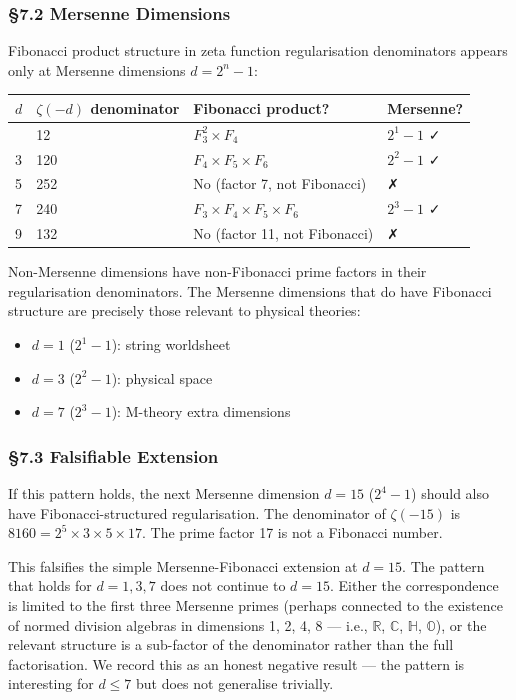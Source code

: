 \documentclass[
  11pt,
  a4paper]{article}
\providecommand{\tightlist}{%
  \setlength{\itemsep}{0pt}\setlength{\parskip}{0pt}}
\begin{document}
\subsubsection{§7.2 Mersenne Dimensions}\label{mersenne-dimensions}

Fibonacci product structure in zeta function regularisation denominators
appears only at Mersenne dimensions \(d = 2^n - 1\):

\begin{longtable}[]{@{}llll@{}}
\toprule\noalign{}
\(d\) & \(\zeta(-d)\) denominator & Fibonacci product? & Mersenne? \\
\midrule\noalign{}
\endhead
\bottomrule\noalign{}
\endlastfoot
1 & 12 & \(F_3^2 \times F_4\) & \(2^1 - 1\) ✓ \\
3 & 120 & \(F_4 \times F_5 \times F_6\) & \(2^2 - 1\) ✓ \\
5 & 252 & No (factor 7, not Fibonacci) & ✗ \\
7 & 240 & \(F_3 \times F_4 \times F_5 \times F_6\) & \(2^3 - 1\) ✓ \\
9 & 132 & No (factor 11, not Fibonacci) & ✗ \\
\end{longtable}

Non-Mersenne dimensions have non-Fibonacci prime factors in their
regularisation denominators. The Mersenne dimensions that do have
Fibonacci structure are precisely those relevant to physical theories:

\begin{itemize}
\tightlist
\item
  \(d = 1\) (\(2^1 - 1\)): string worldsheet
\item
  \(d = 3\) (\(2^2 - 1\)): physical space
\item
  \(d = 7\) (\(2^3 - 1\)): M-theory extra dimensions
\end{itemize}

\subsubsection{§7.3 Falsifiable Extension}\label{falsifiable-extension}

If this pattern holds, the next Mersenne dimension \(d = 15\)
(\(2^4 - 1\)) should also have Fibonacci-structured regularisation. The
denominator of \(\zeta(-15)\) is
\(8160 = 2^5 \times 3 \times 5 \times 17\). The prime factor 17 is not a
Fibonacci number.

This falsifies the simple Mersenne-Fibonacci extension at \(d = 15\).
The pattern that holds for \(d = 1, 3, 7\) does not continue to
\(d = 15\). Either the correspondence is limited to the first three
Mersenne primes (perhaps connected to the existence of normed division
algebras in dimensions 1, 2, 4, 8 --- i.e., \(\mathbb{R}\),
\(\mathbb{C}\), \(\mathbb{H}\), \(\mathbb{O}\)), or the relevant
structure is a sub-factor of the denominator rather than the full
factorisation. We record this as an honest negative result --- the
pattern is interesting for \(d \leq 7\) but does not generalise
trivially.
\end{document}

